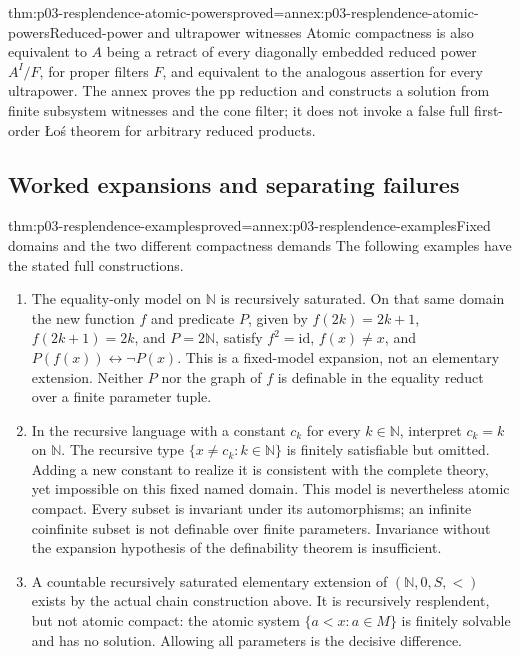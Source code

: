 \begin{hbtheorem}{thm:p03-resplendence-atomic-powers}{proved=annex:p03-resplendence-atomic-powers}{Reduced-power and ultrapower witnesses}
Atomic compactness is also equivalent to \(A\) being a retract of every
diagonally embedded reduced power \(A^I/F\), for proper filters \(F\),
and equivalent to the analogous assertion for every ultrapower.
The annex proves the pp reduction and constructs a solution from finite
subsystem witnesses and the cone filter; it does not invoke a false
full first-order \L o\'s theorem for arbitrary reduced products.
\end{hbtheorem}

\subsection{Worked expansions and separating failures}

\begin{hbtheorem}{thm:p03-resplendence-examples}{proved=annex:p03-resplendence-examples}{Fixed domains and the two different compactness demands}
The following examples have the stated full constructions.
\begin{enumerate}
\item The equality-only model on \(\mathbb N\) is recursively saturated.
On that same domain the new function \(f\) and predicate \(P\), given
by \(f(2k)=2k+1\), \(f(2k+1)=2k\), and \(P=2\mathbb N\), satisfy
\(f^2=\mathrm{id}\), \(f(x)\ne x\), and
\(P(f(x))\leftrightarrow\neg P(x)\). This is a fixed-model expansion,
not an elementary extension. Neither \(P\) nor the graph of \(f\)
is definable in the equality reduct over a finite parameter tuple.
\item In the recursive language with a constant \(c_k\) for every
\(k\in\mathbb N\), interpret \(c_k=k\) on \(\mathbb N\).
The recursive type \(\{x\ne c_k:k\in\mathbb N\}\) is finitely
satisfiable but omitted. Adding a new constant to realize it is consistent
with the complete theory, yet impossible on this fixed named domain.
This model is nevertheless atomic compact. Every subset is invariant
under its automorphisms; an infinite coinfinite subset is not definable
over finite parameters. Invariance without the expansion hypothesis
of the definability theorem is insufficient.
\item A countable recursively saturated elementary extension of
\((\mathbb N,0,S,<)\) exists by the actual chain construction above.
It is recursively resplendent, but not atomic compact: the atomic
system \(\{a<x:a\in M\}\) is finitely solvable and has no solution.
Allowing all parameters is the decisive difference.
\end{enumerate}
\end{hbtheorem}

